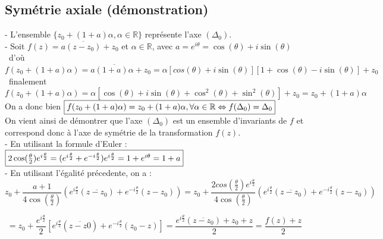 \documentclass{article}
\begin{document}
    \subsection{Symétrie axiale (démonstration)}

    - L'ensemble $\{z_{0} + (1 + a)\alpha, \alpha \in \mathbb{R}\}$ représente l'axe $(\Delta_{0})$. \\
    
    - Soit $f(z) = a\overline{(z - z_0)} + z_0$ et 
    $\alpha \in \mathbb{R}$, avec $a = e^{i\theta} = \cos(\theta) + i\sin(\theta)$ \\
    \
    d'où 
    $f(z_{0} + (1 + a)\alpha) = a\overline{(1 + a)\alpha} + z_0 = \alpha [cos(\theta) + i\sin(\theta)][1 + \cos(\theta) - i\sin(\theta)] + z_0$ \\
    \
    finalement
    $f(z_{0} + (1 + a)\alpha) = \alpha [\cos(\theta) + i\sin(\theta) + \cos^2(\theta) + \sin^2(\theta)] + z_0 =  z_0 + (1 + a)\alpha$ \\
    
    On a donc bien $\fbox{$f(z_{0} + (1 + a)\alpha) = z_{0} + (1 + a)\alpha, \forall \alpha \in \mathbb{R} \Leftrightarrow f(\Delta_0) = \Delta_0$}$\\

    On vient ainsi de démontrer que l'axe $(\Delta_0)$ est un ensemble d'invariants de $f$ et correspond donc à l'axe
    de symétrie de la transformation $f(z)$.\\

    - En utilisant la formule d'Euler : $\fbox{$2\cos(\frac{\theta}{2}) e^{i\frac{\theta}{2}} =
     (e^{i\frac{\theta}{2}} + e^{-i\frac{\theta}{2}})e^{i\frac{\theta}{2}} = 1 + e^{i\theta} = 1 + a$}$\\

     - En utilisant l'égalité précedente, on a : \\

     $$z_0 + \frac{a + 1}{4 \cos(\frac{\theta}{2})} (e^{i\frac{\theta}{2}} (\overline{z - z_0}) + 
     e^{-i\frac{\theta}{2}} (z - z_0)) 
     = 
     z_0 + \frac{2cos(\frac{\theta}{2}) e^{i\frac{\theta}{2}}}{4 \cos(\frac{\theta}{2})} (e^{i\frac{\theta}{2}} (\overline{z - z_0}) + 
     e^{-i\frac{\theta}{2}} (z - z_0))$$

     $$ = z_0 + \frac{e^{i\frac{\theta}{2}}}{2} [e^{i\frac{\theta}{2}}(\overline{z - z0}) + e^{-i\frac{\theta}{2}} (z_0 - z)]
     =
     \frac{e^{i\frac{\theta}{2}} (\overline{z - z_0}) + z_0 + z}{2}
     =
     \frac{f(z) + z}{2}
     $$\\
     
\end{document}

